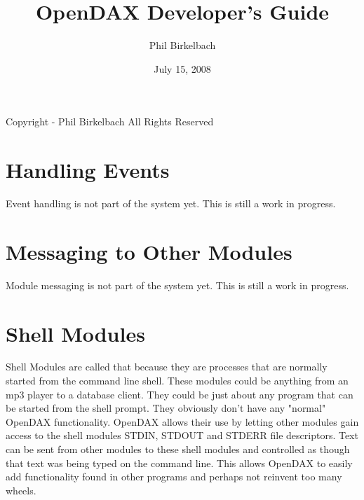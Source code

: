 

\title{OpenDAX Developer's Guide}
\date{July 15, 2008}
\author{Phil Birkelbach}


\maketitle
\begin{flushleft}
Copyright  - Phil Birkelbach\linebreak
All Rights Reserved

\end{flushleft}

\tableofcontents
\newpage
{}







\chapter{Handling Events}

Event handling is not part of the system yet.  This is still a work in progress.

\chapter{Messaging to Other Modules}

Module messaging is not part of the system yet.  This is still a work in progress.

\chapter{Shell Modules}

Shell Modules are called that because they are processes that are normally started from the command line shell.  These modules could be anything from an mp3 player to a database client.  They could be just about any program that can be started from the shell prompt.  They obviously don't have any "normal" OpenDAX functionality.  OpenDAX allows their use by letting other modules gain access to the shell modules STDIN, STDOUT and STDERR file descriptors.  Text can be sent from other modules to these shell modules and controlled as though that text was being typed on the command line.  This allows OpenDAX to easily add functionality found in other programs and perhaps not reinvent too many wheels.


